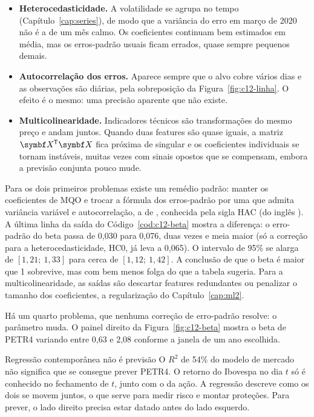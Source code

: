 \begin{itemize}
  \item \textbf{Heterocedasticidade.} A volatilidade se agrupa no tempo (Capítulo~\ref{cap:series}), de modo que a variância do erro em março de 2020 não é a de um mês calmo. Os coeficientes continuam bem estimados em média, mas os erros-padrão usuais ficam errados, quase sempre pequenos demais.
  \item \textbf{Autocorrelação dos erros.} Aparece sempre que o alvo cobre vários dias e as observações são diárias, pela sobreposição da Figura~\ref{fig:c12-linha}. O efeito é o mesmo: uma precisão aparente que não existe.
  \item \textbf{Multicolinearidade.} Indicadores técnicos são transformações do mesmo preço e andam juntos. Quando duas features são quase iguais, a matriz $\vetor{X}\T\vetor{X}$ fica próxima de singular e os coeficientes individuais se tornam instáveis, muitas vezes com sinais opostos que se compensam, embora a previsão conjunta pouco mude.
\end{itemize}

Para os dois primeiros problemas existe um remédio padrão: manter os coeficientes de MQO e trocar a fórmula dos erros-padrão por uma que admita variância variável e autocorrelação, a de \citet{newey1987}, conhecida pela sigla HAC (do inglês ). A última linha da saída do Código~\ref{cod:c12-beta} mostra a diferença: o erro-padrão do beta passa de 0,030 para 0,076, duas vezes e meia maior (só a correção para a heterocedasticidade, HC0, já leva a 0,065). O intervalo de 95\% se alarga de $[1,21;\ 1,33]$ para cerca de $[1,12;\ 1,42]$. A conclusão de que o beta é maior que 1 sobrevive, mas com bem menos folga do que a tabela sugeria. Para a multicolinearidade, as saídas são descartar features redundantes ou penalizar o tamanho dos coeficientes, a regularização do Capítulo~\ref{cap:ml2}.

Há um quarto problema, que nenhuma correção de erro-padrão resolve: o parâmetro muda. O painel direito da Figura~\ref{fig:c12-beta} mostra o beta de PETR4 variando entre 0,63 e 2,08 conforme a janela de um ano escolhida.

\begin{armadilha}{Regressão contemporânea não é previsão}
O $R^2$ de 54\% do modelo de mercado não significa que se consegue prever PETR4. O retorno do Ibovespa no dia $t$ só é conhecido no fechamento de $t$, junto com o da ação. A regressão descreve como os dois se movem juntos, o que serve para medir risco e montar proteções. Para prever, o lado direito precisa estar datado antes do lado esquerdo.
\end{armadilha}


